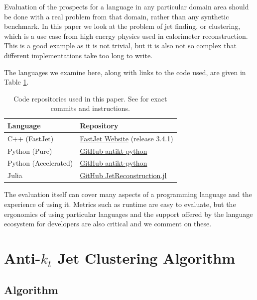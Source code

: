 \documentclass{webofc}
\begin{document}
Evaluation of the prospects for a language in any particular domain area should
be done with a real problem from that domain, rather than any synthetic
benchmark. In this paper we look at the problem of jet finding, or clustering,
which is a use case from high energy physics used in calorimeter reconstruction.
This is a good example as it is not trivial, but it is also not so complex that
different implementations take too long to write.

The languages we examine here, along with links to the code used, are given in
Table \ref{tab:versions}.

\begin{table}
  \begin{center}
    \begin{tabular}{l|l}
      \textbf{Language} & \textbf{Repository} \\
      \hline
      C++ (FastJet) & \href{https://fastjet.fr/}{FastJet Website} (release 3.4.1) \\
      Python (Pure) & \href{https://github.com/graeme-a-stewart/antikt-python}{GitHub antikt-python} \\
      Python (Accelerated) & \href{https://github.com/graeme-a-stewart/antikt-python}{GitHub antikt-python} \\
      Julia & \href{https://github.com/JuliaHEP/JetReconstruction.jl}{GitHub JetReconstruction.jl} \\
    \end{tabular}
    \caption{Code repositories used in this paper. See \cite{polyglot-jets-zenodo} for exact commits and instructions.}
    \label{tab:versions}
  \end{center}
\end{table}

The evaluation itself can cover many aspects of a programming language and the
experience of using it. Metrics such as runtime are easy to evaluate, but the
ergonomics of using particular languages and the support offered by the language
ecosystem for developers are also critical and we comment on these.

\section{Anti-$k_t$ Jet Clustering Algorithm}
\label{sec:antikt}

\subsection{Algorithm}
\label{sec:alg}
\end{document}
